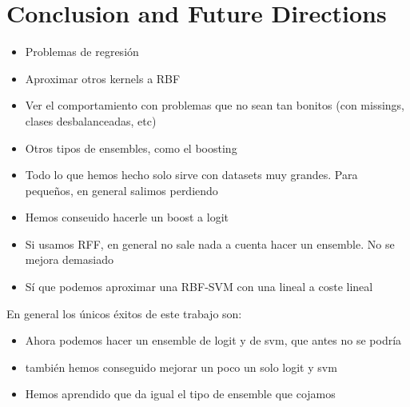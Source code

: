 
\chapter{Conclusion and Future Directions} %

\label{Chapter5} %


\begin{note}
  \begin{itemize}
    \item Problemas de regresión
    \item Aproximar otros kernels a RBF
    \item Ver el comportamiento con problemas que no sean tan bonitos (con
    missings, clases desbalanceadas, etc)
    \item Otros tipos de ensembles, como el boosting
  \end{itemize}
\end{note}

\begin{note}
  \begin{itemize}
  \item Todo lo que hemos hecho solo sirve con datasets muy grandes. Para
  pequeños, en general salimos perdiendo
  \item Hemos conseuido hacerle un boost a logit
  \item Si usamos RFF, en general no sale nada a cuenta hacer un
  ensemble. No se mejora demasiado
  \item Sí que podemos aproximar una RBF-SVM con una lineal a coste lineal
\end{itemize}

En general los únicos éxitos de este trabajo son:
\begin{itemize}
  \item Ahora podemos hacer un ensemble de logit y de svm, que antes no se podría
  \item también hemos conseguido mejorar un poco un solo logit y svm
  \item Hemos aprendido que da igual el tipo de ensemble que cojamos
\end{itemize}
\end{note}
